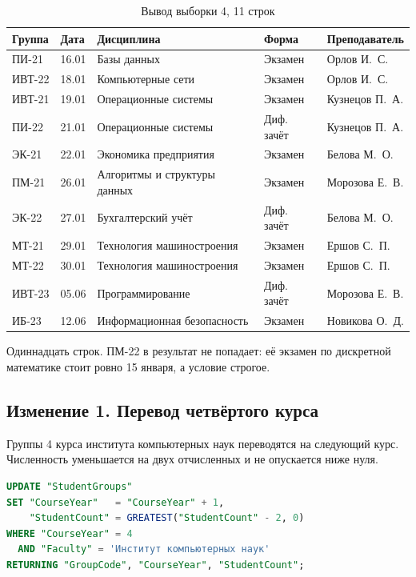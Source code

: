 \documentclass[12pt,a4paper]{article}
\begin{document}
\begin{table}[H]
\centering
\caption{Вывод выборки 4, 11 строк}
\footnotesize
\begin{tabular}{llp{}lp{}}
\toprule
Группа & Дата & Дисциплина & Форма & Преподаватель \\
\midrule
ПИ-21 & 16.01 & Базы данных & Экзамен & Орлов И.~С. \\
ИВТ-22 & 18.01 & Компьютерные сети & Экзамен & Орлов И.~С. \\
ИВТ-21 & 19.01 & Операционные системы & Экзамен & Кузнецов П.~А. \\
ПИ-22 & 21.01 & Операционные системы & Диф. зачёт & Кузнецов П.~А. \\
ЭК-21 & 22.01 & Экономика предприятия & Экзамен & Белова М.~О. \\
ПМ-21 & 26.01 & Алгоритмы и структуры данных & Экзамен & Морозова Е.~В. \\
ЭК-22 & 27.01 & Бухгалтерский учёт & Диф. зачёт & Белова М.~О. \\
МТ-21 & 29.01 & Технология машиностроения & Экзамен & Ершов С.~П. \\
МТ-22 & 30.01 & Технология машиностроения & Экзамен & Ершов С.~П. \\
ИВТ-23 & 05.06 & Программирование & Диф. зачёт & Морозова Е.~В. \\
ИБ-23 & 12.06 & Информационная безопасность & Экзамен & Новикова О.~Д. \\
\bottomrule
\end{tabular}
\end{table}




Одиннадцать строк. ПМ-22 в результат не попадает: её экзамен по дискретной математике стоит ровно 15 января, а условие строгое.

\subsection*{Изменение 1. Перевод четвёртого курса}
Группы 4 курса института компьютерных наук переводятся на следующий курс. Численность уменьшается на двух отчисленных и не опускается ниже нуля.

\begin{lstlisting}[language=SQL]
UPDATE "StudentGroups"
SET "CourseYear"   = "CourseYear" + 1,
    "StudentCount" = GREATEST("StudentCount" - 2, 0)
WHERE "CourseYear" = 4
  AND "Faculty" = 'Институт компьютерных наук'
RETURNING "GroupCode", "CourseYear", "StudentCount";
\end{lstlisting}
\end{document}
